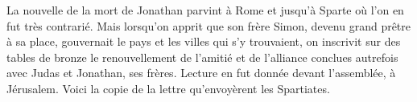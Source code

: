 La nouvelle de la mort de Jonathan parvint à Rome et jusqu’à Sparte
	où l’on en fut très contrarié.
Mais lorsqu’on apprit que son frère Simon, devenu grand prêtre à sa place,
	gouvernait le pays et les villes qui s’y trouvaient,
	on inscrivit sur des tables de bronze 
		le renouvellement de l’amitié et de l’alliance 
		conclues autrefois avec Judas et Jonathan, ses frères.
Lecture en fut donnée devant l’assemblée, à Jérusalem.
Voici la copie de la lettre qu’envoyèrent les Spartiates.
